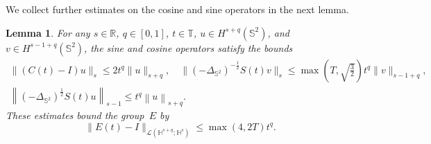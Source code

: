 \documentclass[a4paper]{amsart}
\newtheorem{lem}[thm]{Lemma}
\theoremstyle{remark}
\theoremstyle{definition}
\newcommand{\HH}{\mathbb{H}}
\newcommand{\IS}{\mathbb{S}}
\newcommand{\IT}{\mathbb{T}}
\begin{document}
We collect further estimates on the cosine and sine operators in the next lemma.
\begin{lem}
\label{lem_op2}
For any $s\in\mathbb{R}$, $q \in [0,1]$, $t \in \IT$, $u \in H^{s+q}(\IS^2)$, and $v \in H^{s-1+q}(\IS^2)$, the sine and cosine operators satisfy the bounds
\begin{gather*}
    \| (C(t) - I)u \|_s
         \le 2 t^q \|u\|_{s+q}, \quad
    \| (-\Delta_{\mathbb{S}^2})^{-\frac{1}{2}} S(t)v \|_s
        \le \max\left(T, \sqrt{\tfrac{3}{2}}\right) t^q \|v\|_{s-1+q}, \\
    \left\|(-\Delta_{\mathbb{S}^2})^{\frac{1}{2}}S(t) u\right\|_{s-1}
         \le t^q \left\|u\right\|_{s+q}.
\end{gather*}
These estimates bound the group~$E$ by
\begin{equation*} %
    \| E(t) - I \|_{\mathcal{L}(\HH^{s+q};\HH^s)}
        \le \max (4, 2T) t^q .
\end{equation*}
\end{lem}
\end{document}
